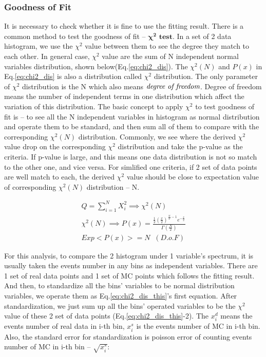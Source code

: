 		\subsubsection{Goodness of Fit}
		\label{sssec:GoF}

		It is necessary to check whether it is fine to use the fitting result. There is a common method to test the goodness of fit -- $\boldsymbol{\chi^2}$ $\textbf{test}$. In a set of 2 data histogram, we use the $\chi^2$ value between them to see the degree they match to each other. In general case, $\chi^2$ value are the sum of N independent normal variables distribution, shown below(Eq.\ref{eq:chi2_dis}). The $\chi^2(N)$ and $P(x)$ in Eq.\ref{eq:chi2_dis} is also a distribution called $\chi^2$ distribution. The only parameter of $\chi^2$ distribution is the N which also means $\emph{degree of freedom}$. Degree of freedom means the number of independent terms in one distribution which affect the variation of this distribution. 
		The basic concept to apply $\chi^2$ to test goodness of fit is -- to see all the N independent variables in histogram as normal distribution and operate them to be standard, and then sum all of them to compare with the corresponding $\chi^2(N)$ distribution. Commonly, we see where the derived $\chi^2$ value drop on the corresponding $\chi^2$ distribution and take the p-value as the criteria. If p-value is large, and this means one data distribution is not so match to the other one, and vice versa. For simlified one criteria, if 2 set of data points are well match to each, the derived $\chi^2$ value should be close to expectation value of corresponding $\chi^2(N)$ distribution -- N.

		\begin{equation}
		\begin{split}
		Q = \sum_{i=1}^{N} X_i^2 \implies \chi^2(N) \\ %
		\chi^2(N) \implies P(x) = \frac{\frac{1}{2}(\frac{x}{2})^{\frac{N}{2} - 1}e^{-\frac{x}{2}}}{\Gamma (\frac{N}{2})} \\
		Exp<P(x)> = N \; \; (D.o.F)
		\label{eq:chi2_dis}
		\end{split}
		\end{equation}

		For this analysis, to compare the 2 histogram under 1 variable's spectrum, it is usually taken the events number in any bins as independent variables. There are 1 set of real data points and 1 set of MC points which follows the fitting result. And then, to standardize all the bins' variables to be normal distribution variables, we operate them as Eq.\ref{eq:chi2_dis_this}'s first equation. After standardization, we just sum up all the bins' operated variables to be the $\chi^2$ value of these 2 set of data points (Eq.\ref{eq:chi2_dis_this}-2). The $x^d_i$ means the events number of real data in i-th bin, $x^s_i$ is the events number of MC in i-th bin. Also, the standard error for standardization is poisson error of counting events number of MC in i-th bin -- $\sqrt{x^s_i}$:

